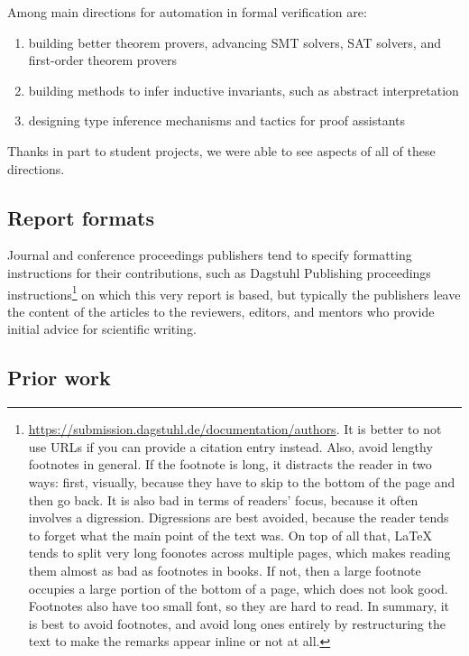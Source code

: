 \documentclass[a4paper,UKenglish,cleveref, autoref, thm-restate]{lipics-v2021}
\begin{document}
Among main directions for automation in formal verification are:
\begin{enumerate}
\item building better theorem provers, advancing SMT solvers, SAT solvers, and first-order theorem provers
\item building methods to infer inductive invariants, such as abstract interpretation
\item designing type inference mechanisms and tactics for proof assistants
\end{enumerate}
Thanks in part to student projects, we were able to see aspects of all of these directions.

\subsection{Report formats}
Journal and conference proceedings publishers tend to
specify formatting instructions for their contributions,
such as Dagstuhl Publishing proceedings instructions\footnote{\url{https://submission.dagstuhl.de/documentation/authors}.
  It is better to not use URLs if you can provide a citation entry instead. Also, avoid lengthy footnotes in general.
  If the footnote is long, it distracts the reader in two ways: first, visually, because they have to skip to the bottom
  of the page and then go back. It is also bad in terms of readers' focus, because it often involves a digression.
  Digressions are best avoided, because the reader tends to forget what the main point of the text was. On top of all that,
  LaTeX tends to split very long foonotes across multiple pages, which makes reading them almost as bad as footnotes in books.
  If not, then a large footnote occupies a large portion of the bottom of a page, which does not look good. Footnotes also
  have too small font, so they are hard to read.
  In summary, it is best to avoid footnotes, and avoid long ones entirely by restructuring the text to make the remarks
  appear inline or not at all.}
on which this very report is based, but typically the publishers
leave the content of the articles to the reviewers,
editors, and mentors who provide initial advice for
scientific writing.

\subsection{Prior work}
\end{document}
